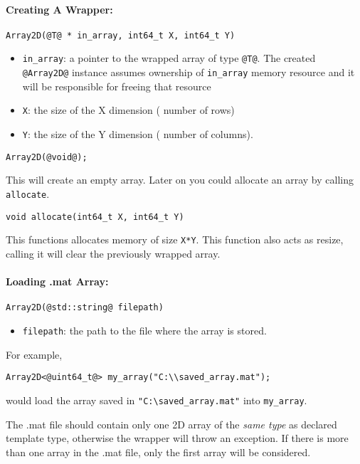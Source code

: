 \documentclass[12pt,letterpaper]{article}
\makeatletter
\def\keyhl[#1]{\lstinline{@#1@}}
\makeatother
\begin{document}
\paragraph{Creating A Wrapper:}\hspace{-2ex}
\begin{lstlisting}
Array2D(@T@ * in_array, int64_t X, int64_t Y)
\end{lstlisting}
\begin{itemize}
\item \lstinline{in_array}: a pointer to the wrapped array of type \lstinline{@T@}. The created \keyhl[Array2D] instance assumes ownership of \lstinline{in_array} memory resource and it will be responsible for freeing that resource
\item \lstinline{X}: the size of the X dimension ( number of rows)
\item \lstinline{Y}: the size of the Y dimension ( number of columns).
\end{itemize}

\begin{lstlisting}
Array2D(@void@);
\end{lstlisting}
This will create an empty array. Later on you could allocate an array by calling \lstinline{allocate}.
\begin{lstlisting}
void allocate(int64_t X, int64_t Y)
\end{lstlisting}
This functions allocates memory of size \lstinline{X*Y}. This function also acts as resize, calling it will clear the previously wrapped array.

\paragraph{Loading .mat Array:}\hspace{-2ex}
\begin{lstlisting}
Array2D(@std::string@ filepath)
\end{lstlisting}
\begin{itemize}
\item \lstinline{filepath}: the path to the file where the array is stored.
\end{itemize}
For example,
\begin{lstlisting}
Array2D<@uint64_t@> my_array("C:\\saved_array.mat");
\end{lstlisting}
would load the array saved in \lstinline{"C:\saved_array.mat"} into \lstinline{my_array}.
\begin{tcolorbox}
The .mat file should contain only one 2D array of the {\em same type} as declared template type, otherwise the wrapper will throw an exception. If there is more than one array in the .mat file, only the first array will be considered.
\end{tcolorbox}
\end{document}
